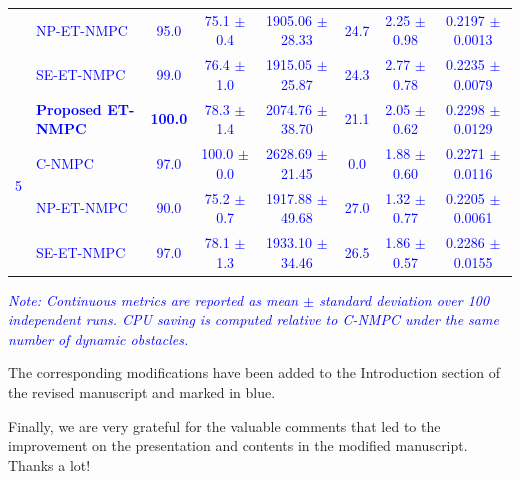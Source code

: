 \documentclass[12pt, twosides]{article}
\theoremstyle{definition}
\begin{document}
\begin{table}[htbp]
{\begin{tabular}{c l c c c c c c}
			& \textcolor{blue}{NP-ET-NMPC} & \textcolor{blue}{95.0} & \textcolor{blue}{75.1 $\pm$ 0.4} & \textcolor{blue}{1905.06 $\pm$ 28.33} & \textcolor{blue}{24.7} & \textcolor{blue}{2.25 $\pm$ 0.98} & \textcolor{blue}{0.2197 $\pm$ 0.0013} \\
			& \textcolor{blue}{SE-ET-NMPC} & \textcolor{blue}{99.0} & \textcolor{blue}{76.4 $\pm$ 1.0} & \textcolor{blue}{1915.05 $\pm$ 25.87} & \textcolor{blue}{24.3} & \textcolor{blue}{2.77 $\pm$ 0.78} & \textcolor{blue}{0.2235 $\pm$ 0.0079} \\
			\midrule
			\multirow{4}{*}{\textcolor{blue}{5}}
			& \textbf{\textcolor{blue}{Proposed ET-NMPC}} & \textbf{\textcolor{blue}{100.0}} & \textcolor{blue}{78.3 $\pm$ 1.4} & \textcolor{blue}{2074.76 $\pm$ 38.70} & \textcolor{blue}{21.1} & \textcolor{blue}{2.05 $\pm$ 0.62} & \textcolor{blue}{0.2298 $\pm$ 0.0129} \\
			& \textcolor{blue}{C-NMPC} & \textcolor{blue}{97.0} & \textcolor{blue}{100.0 $\pm$ 0.0} & \textcolor{blue}{2628.69 $\pm$ 21.45} & \textcolor{blue}{0.0} & \textcolor{blue}{1.88 $\pm$ 0.60} & \textcolor{blue}{0.2271 $\pm$ 0.0116} \\
			& \textcolor{blue}{NP-ET-NMPC} & \textcolor{blue}{90.0} & \textcolor{blue}{75.2 $\pm$ 0.7} & \textcolor{blue}{1917.88 $\pm$ 49.68} & \textcolor{blue}{27.0} & \textcolor{blue}{1.32 $\pm$ 0.77} & \textcolor{blue}{0.2205 $\pm$ 0.0061} \\
			& \textcolor{blue}{SE-ET-NMPC} & \textcolor{blue}{97.0} & \textcolor{blue}{78.1 $\pm$ 1.3} & \textcolor{blue}{1933.10 $\pm$ 34.46} & \textcolor{blue}{26.5} & \textcolor{blue}{1.86 $\pm$ 0.57} & \textcolor{blue}{0.2286 $\pm$ 0.0155} \\
			\bottomrule
		\end{tabular}%
	}
	\vspace{2pt}
	\begin{flushleft}
		\textit{\textcolor{blue}{Note: Continuous metrics are reported as mean $\pm$ standard deviation over 100 independent runs. CPU saving is computed relative to C-NMPC under the same number of dynamic obstacles.}}
	\end{flushleft}
\end{table}

The corresponding modifications have been added to the Introduction section of the revised manuscript and marked in blue.

\medskip

Finally, we are very grateful for the valuable comments that led to the improvement on the presentation and contents in the modified manuscript. Thanks a lot!
\end{document}
